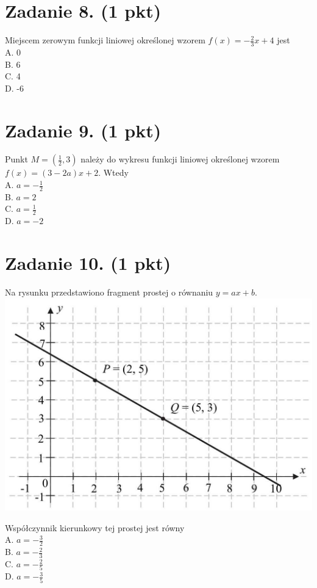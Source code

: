 \documentclass[10pt]{article}
\begin{document}
\section*{Zadanie 8. (1 pkt)}
Miejscem zerowym funkcji liniowej określonej wzorem \(f(x)=-\frac{2}{3} x+4\) jest\\
A. 0\\
B. 6\\
C. 4\\
D. -6

\section*{Zadanie 9. (1 pkt)}
Punkt \(M=\left(\frac{1}{2}, 3\right)\) należy do wykresu funkcji liniowej określonej wzorem \(f(x)=(3-2 a) x+2\). Wtedy\\
A. \(a=-\frac{1}{2}\)\\
B. \(a=2\)\\
C. \(a=\frac{1}{2}\)\\
D. \(a=-2\)

\section*{Zadanie 10. (1 pkt)}
Na rysunku przedstawiono fragment prostej o równaniu \(y=a x+b\).\\
\includegraphics[max width=\textwidth, center]{2024_11_21_e19607c15353cb4d7e48g-04}

Współczynnik kierunkowy tej prostej jest równy\\
A. \(a=-\frac{3}{2}\)\\
B. \(a=-\frac{2}{3}\)\\
C. \(a=-\frac{2}{5}\)\\
D. \(a=-\frac{3}{5}\)
\end{document}
